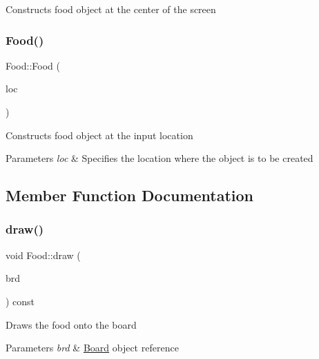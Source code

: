 Constructs food object at the center of the screen \mbox{\label{class_food_abf88eb6961b943a2d481c08eca91cc2d}} 
\subsubsection{\texorpdfstring{Food()}{Food()}\hspace{0.1cm}{\footnotesize\ttfamily [2/2]}}
{\footnotesize\ttfamily Food\+::\+Food (\begin{DoxyParamCaption}\item[{\hyperlink{class_pixel_location}{Pixel\+Location}}]{loc }\end{DoxyParamCaption})}

Constructs food object at the input location


\begin{DoxyParams}{Parameters}
{\em loc} & Specifies the location where the object is to be created \\
\hline
\end{DoxyParams}


\subsection{Member Function Documentation}
\mbox{\label{class_food_a2757ddcb688ca74d3e2e79d645e0ed0e}} 
\subsubsection{\texorpdfstring{draw()}{draw()}}
{\footnotesize\ttfamily void Food\+::draw (\begin{DoxyParamCaption}\item[{\hyperlink{class_board}{Board} \&}]{brd }\end{DoxyParamCaption}) const}

Draws the food onto the board


\begin{DoxyParams}{Parameters}
{\em brd} & \hyperlink{class_board}{Board} object reference \\
\hline
\end{DoxyParams}
\mbox{\label{class_food_a7c3ffe081ee2b479696c0c89ed95455c}} 

